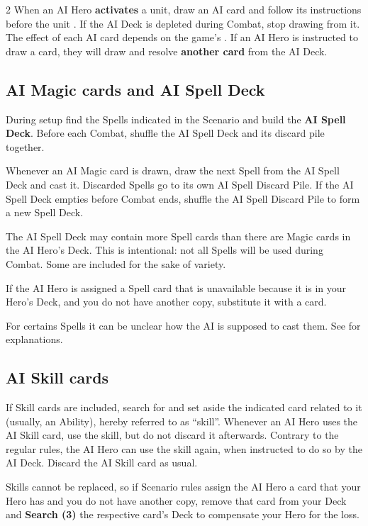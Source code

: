\begin{multicols*}{2}
  When an AI Hero \textbf{activates} a unit, draw an AI card and follow its instructions before the unit .
  If the AI Deck is depleted during Combat, stop drawing from it.
  The effect of each AI card depends on the game's .
  If an AI Hero is instructed to draw a card, they will draw and resolve \textbf{another card} from the AI Deck.

  \subsection*{AI Magic cards and AI Spell Deck}
  During setup find the Spells indicated in the Scenario and build the \textbf{AI Spell Deck}.
  Before each Combat, shuffle the AI Spell Deck and its discard pile together.

  Whenever an AI Magic  card is drawn, draw the next Spell from the AI Spell Deck and cast it.
  Discarded Spells go to its own AI Spell Discard Pile.
  If the AI Spell Deck empties before Combat ends, shuffle the AI Spell Discard Pile to form a new Spell Deck.

  The AI Spell Deck may contain more Spell cards than there are Magic cards in the AI Hero's Deck.
  This is intentional: not all Spells will be used during Combat.
  Some are included for the sake of variety.

  If the AI Hero is assigned a Spell card that is unavailable because it is in your Hero's Deck, and you do not have another copy, substitute it with a  card.

  For certains Spells it can be unclear how the AI is supposed to cast them.
  See  for explanations.

  \subsection*{AI Skill cards}
  If Skill cards are included, search for and set aside the indicated card related to it (usually, an Ability), hereby referred to as ``skill''.
  Whenever an AI Hero uses the AI Skill  card, use the skill, but do not discard it afterwards.
  Contrary to the regular rules, the AI Hero can use the skill again, when instructed to do so by the AI Deck.
  Discard the AI Skill  card as usual.

  Skills cannot be replaced, so if Scenario rules assign the AI Hero a card that your Hero has and you do not have another copy, remove that card from your Deck and \textbf{Search (3)} the respective card's Deck to compensate your Hero for the loss.


\end{multicols*}
